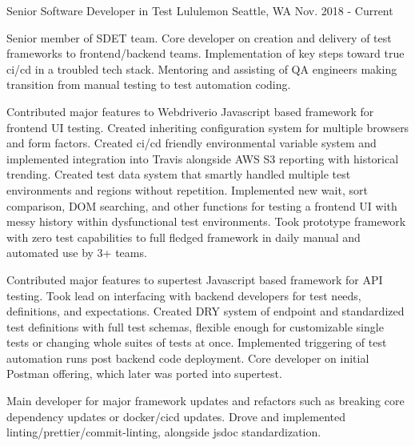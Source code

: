 

\begin{cventries}

  \cventry
    {Senior Software Developer in Test} %
    {Lululemon} %
    {Seattle, WA} %
    {Nov. 2018 - Current} %
    {
      \begin{cvitems} %
        \item[] {Senior member of SDET team. Core developer on creation and delivery of test frameworks to frontend/backend teams. Implementation of key steps toward true ci/cd in a troubled tech stack. Mentoring and assisting of QA engineers making transition from manual testing to test automation coding.}
        \item[]
        \item {Contributed major features to Webdriverio Javascript based framework for frontend UI testing. Created inheriting configuration system for multiple browsers and form factors. Created ci/cd friendly environmental variable system and implemented integration into Travis alongside AWS S3 reporting with historical trending. Created test data system that smartly handled multiple test environments and regions without repetition. Implemented new wait, sort comparison, DOM searching, and other functions for testing a frontend UI with messy history within dysfunctional test environments. Took prototype framework with zero test capabilities to full fledged framework in daily manual and automated use by 3+ teams.}
		\item {Contributed major features to supertest Javascript based framework for API testing. Took lead on interfacing with backend developers for test needs, definitions, and expectations. Created DRY system of endpoint and standardized test definitions with full test schemas, flexible enough for customizable single tests or changing whole suites of tests at once. Implemented triggering of test automation runs post backend code deployment.  Core developer on initial Postman offering, which later was ported into supertest. }
		\item {Main developer for major framework updates and refactors such as breaking core dependency updates or docker/cicd updates. Drove and implemented linting/prettier/commit-linting, alongside jsdoc standardization.}

\end{cvitems}}
\end{cventries}

